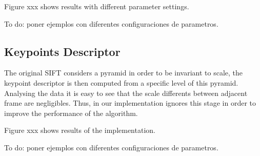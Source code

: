 Figure xxx shows results with different parameter settings.


To do: poner ejemplos con diferentes configuraciones de parametros.


\subsection{Keypoints Descriptor}

The original SIFT considers a pyramid in order to be invariant to scale, the keypoint descriptor is then computed from a specific level of this pyramid. Analysing the data it is easy to see that the scale differents between adjacent frame are negligibles. Thus, in our implementation ignores this stage in order to improve the performance of the algorithm.

Figure xxx shows results of the implementation.

To do: poner ejemplos con diferentes configuraciones de parametros.
